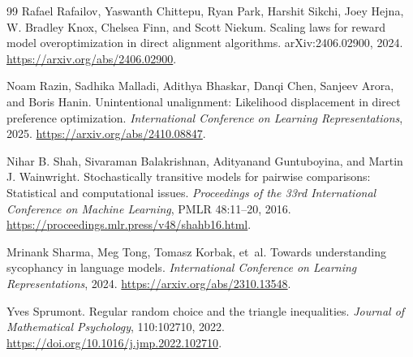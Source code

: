 \documentclass[11pt,twoside]{article}
\theoremstyle{definition}
\theoremstyle{remark}
\begin{document}
\begin{thebibliography}{99}
Rafael Rafailov, Yaswanth Chittepu, Ryan Park, Harshit Sikchi, Joey Hejna,
W. Bradley Knox, Chelsea Finn, and Scott Niekum.
\newblock Scaling laws for reward model overoptimization in direct alignment
algorithms.
\newblock arXiv:2406.02900, 2024.
\newblock \url{https://arxiv.org/abs/2406.02900}.

Noam Razin, Sadhika Malladi, Adithya Bhaskar, Danqi Chen, Sanjeev Arora,
and Boris Hanin.
\newblock Unintentional unalignment: Likelihood displacement in direct
preference optimization.
\newblock \emph{International Conference on Learning Representations}, 2025.
\newblock \url{https://arxiv.org/abs/2410.08847}.

Nihar B. Shah, Sivaraman Balakrishnan, Adityanand Guntuboyina, and
Martin J. Wainwright.
\newblock Stochastically transitive models for pairwise comparisons:
Statistical and computational issues.
\newblock \emph{Proceedings of the 33rd International Conference on Machine
Learning}, PMLR 48:11--20, 2016.
\newblock \url{https://proceedings.mlr.press/v48/shahb16.html}.

Mrinank Sharma, Meg Tong, Tomasz Korbak, et~al.
\newblock Towards understanding sycophancy in language models.
\newblock \emph{International Conference on Learning Representations}, 2024.
\newblock \url{https://arxiv.org/abs/2310.13548}.

Yves Sprumont.
\newblock Regular random choice and the triangle inequalities.
\newblock \emph{Journal of Mathematical Psychology}, 110:102710, 2022.
\newblock \url{https://doi.org/10.1016/j.jmp.2022.102710}.
\end{thebibliography}
\end{document}
